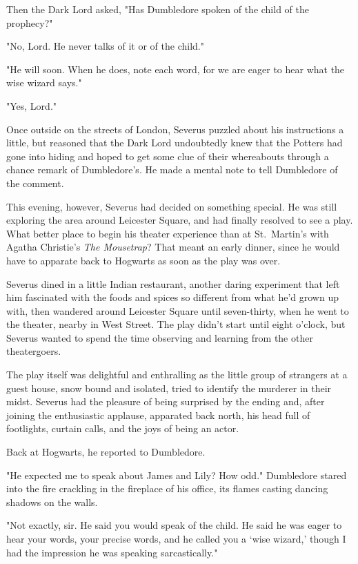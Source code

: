 Then the Dark Lord asked, "Has Dumbledore spoken of the child of the prophecy?"

"No, Lord. He never talks of it or of the child."

"He will soon. When he does, note each word, for we are eager to hear what the wise wizard says."

"Yes, Lord."

Once outside on the streets of London, Severus puzzled about his instructions a little, but reasoned that the Dark Lord undoubtedly knew that the Potters had gone into hiding and hoped to get some clue of their whereabouts through a chance remark of Dumbledore's. He made a mental note to tell Dumbledore of the comment.

This evening, however, Severus had decided on something special. He was still exploring the area around Leicester Square, and had finally resolved to see a play. What better place to begin his theater experience than at St.~Martin's with Agatha Christie's \emph{The Mousetrap}? That meant an early dinner, since he would have to apparate back to Hogwarts as soon as the play was over.

Severus dined in a little Indian restaurant, another daring experiment that left him fascinated with the foods and spices so different from what he'd grown up with, then wandered around Leicester Square until seven-thirty, when he went to the theater, nearby in West Street. The play didn't start until eight o'clock, but Severus wanted to spend the time observing and learning from the other theatergoers.

The play itself was delightful and enthralling as the little group of strangers at a guest house, snow bound and isolated, tried to identify the murderer in their midst. Severus had the pleasure of being surprised by the ending and, after joining the enthusiastic applause, apparated back north, his head full of footlights, curtain calls, and the joys of being an actor.

Back at Hogwarts, he reported to Dumbledore.

"He expected me to speak about James and Lily? How odd." Dumbledore stared into the fire crackling in the fireplace of his office, its flames casting dancing shadows on the walls.

"Not exactly, sir. He said you would speak of the child. He said he was eager to hear your words, your precise words, and he called you a `wise wizard,' though I had the impression he was speaking sarcastically."

